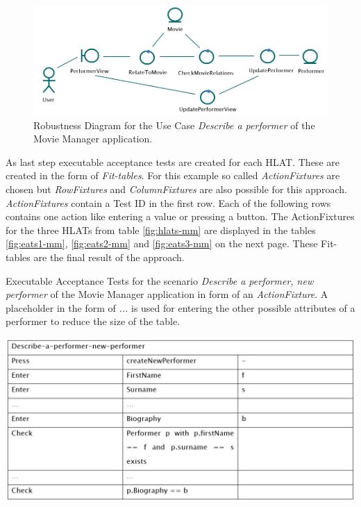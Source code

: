 \begin{figure}[h!]
	\centering
	\includegraphics[width=.8\textwidth]{../images/ElAttarRobustness.png}
	\caption{Robustness Diagram for the Use Case \textit{Describe a performer} of the Movie Manager application.}
	\label{fig:robustness-mm}
\end{figure}



As last step executable acceptance tests are created for each HLAT.
These are created in the form of \textit{Fit-tables}.
For this example so called \textit{ActionFixtures} are chosen but \textit{RowFixtures} and \textit{ColumnFixtures} are also possible for this approach.
\textit{ActionFixtures} contain a Test ID in the first row.
Each of the following rows contains one action like entering a value or pressing a button.
The ActionFixtures for the three HLATs from table \ref{fig:hlats-mm} are displayed in the tables \ref{fig:eats1-mm}, \ref{fig:eats2-mm} and \ref{fig:eats3-mm} on the next page.
These Fit-tables are the final result of the approach.

\begin{table}[H]
	\caption{Executable Acceptance Tests for the scenario \textit{Describe a performer, new performer} of the Movie Manager application in form of an \textit{ActionFixture}. 
	A placeholder in the form of \textit{...} is used for entering the other possible attributes of a performer to reduce the size of the table.}
	\centering
	\includegraphics[width=.9\textwidth]{../images/ElAttarEATs1.png}

	
	\label{fig:eats1-mm}
\end{table}

